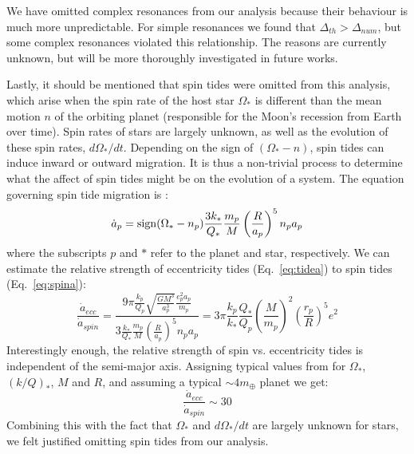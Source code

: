 We have omitted complex resonances from our analysis because their behaviour is much more unpredictable. 
For simple resonances we found that $\Delta_{th} > \Delta_{num}$, but some complex resonances violated this relationship. 
The reasons are currently unknown, but will be more thoroughly investigated in future works. 

Lastly, it should be mentioned that spin tides were omitted from this analysis, which arise when the spin rate of the host star $\Omega_*$ is different than the mean motion $n$ of the orbiting planet (responsible for the Moon's recession from Earth over time). 
Spin rates of \kep{} stars are largely unknown, as well as the evolution of these spin rates, $d\Omega_*/dt$. 
Depending on the sign of $(\Omega_* - n)$, spin tides can induce inward or outward migration. 
It is thus a non-trivial process to determine what the affect of spin tides might be on the evolution of a system. 
The equation governing spin tide migration is \citep{MurrayDermott}:
\begin{equation}
\dot{a}_p = {\rm sign}(\Omega_* - n_p)\frac{3k_*}{Q_*}\frac{m_p}{M}\left(\frac{R}{a_p}\right)^5 n_pa_p
\label{eq:spina}
\end{equation}
where the subscripts $p$ and $*$ refer to the planet and star, respectively. 
We can estimate the relative strength of eccentricity tides (Eq.~\ref{eq:tidea}) to spin tides (Eq.~\ref{eq:spina}):
\begin{equation*}
\frac{\dot{a}_{ecc}}{\dot{a}_{spin}} = \frac{9\pi\frac{k_p}{Q_p} \sqrt{\frac{GM^3}{a_p^3}} \frac{e_p^2a_p}{m_p}}{ 3\frac{k_*}{Q_*}\frac{m_p}{M}\left(\frac{R}{a_p}\right)^5 n_pa_p} = 3\pi\frac{k_p}{k_*}\frac{Q_*}{Q_p}\left(\frac{M}{m_p} \right)^2 \left(\frac{r_p}{R} \right)^5 e^2
\end{equation*}
Interestingly enough, the relative strength of spin vs. eccentricity tides is independent of the semi-major axis.
Assigning typical values from \citet{WuMurray2003} for $\Omega_*$, $(k/Q)_*$, $M$ and $R$, and assuming a typical $\sim 4m_{\oplus}$ planet we get:
\begin{equation}
\frac{\dot{a}_{ecc}}{\dot{a}_{spin}} \sim 30
\end{equation}
Combining this with the fact that $\Omega_*$ and $d\Omega_*/dt$ are largely unknown for \kep{} stars, we felt justified omitting spin tides from our analysis.

